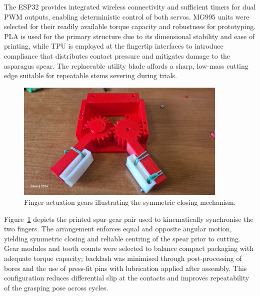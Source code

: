 The ESP32 provides integrated wireless connectivity and sufficient timers for dual PWM outputs,
enabling deterministic control of both servos. MG995 units were selected for their readily available
torque capacity and robustness for prototyping. PLA is used for the primary structure due to its
dimensional stability and ease of printing, while TPU is employed at the fingertip interfaces to
introduce compliance that distributes contact pressure and mitigates damage to the asparagus spear.
The replaceable utility blade affords a sharp, low-mass cutting edge suitable for repeatable stems
severing during trials.



\begin{figure}[H]
    \centering
    \includegraphics[width=0.9\textwidth]{fingerGear.jpg}
    \caption{Finger actuation gears illustrating the symmetric closing mechanism.}
    \label{fig:finger_gears}
    \end{figure}
    
    Figure~\ref{fig:finger_gears} depicts the printed spur-gear pair used to kinematically
    synchronise the two fingers. The arrangement enforces equal and opposite angular motion,
    yielding symmetric closing and reliable centring of the spear prior to cutting. Gear modules
    and tooth counts were selected to balance compact packaging with adequate torque capacity;
    backlash was minimised through post-processing of bores and the use of press-fit pins with
    lubrication applied after assembly. This configuration reduces differential slip at the contacts
    and improves repeatability of the grasping pose across cycles.
    

